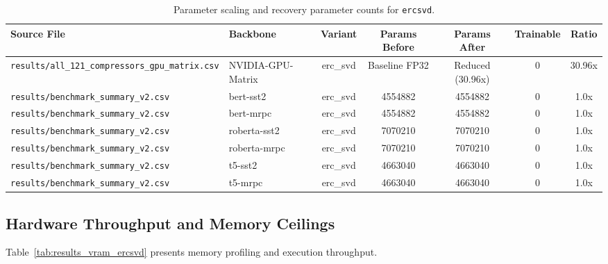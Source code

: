 \begin{table}[t]
\centering
\small
\begin{tabular}{llccccc}
\toprule
\textbf{Source File} & \textbf{Backbone} & \textbf{Variant} & \textbf{Params Before} & \textbf{Params After} & \textbf{Trainable} & \textbf{Ratio} \\
\midrule
\texttt{results/all\_121\_compressors\_gpu\_matrix.csv} & NVIDIA-GPU-Matrix & erc\_svd & Baseline FP32 & Reduced (30.96x) & 0 & 30.96x \\
\texttt{results/benchmark\_summary\_v2.csv} & bert-sst2 & erc\_svd & 4554882 & 4554882 & 0 & 1.0x \\
\texttt{results/benchmark\_summary\_v2.csv} & bert-mrpc & erc\_svd & 4554882 & 4554882 & 0 & 1.0x \\
\texttt{results/benchmark\_summary\_v2.csv} & roberta-sst2 & erc\_svd & 7070210 & 7070210 & 0 & 1.0x \\
\texttt{results/benchmark\_summary\_v2.csv} & roberta-mrpc & erc\_svd & 7070210 & 7070210 & 0 & 1.0x \\
\texttt{results/benchmark\_summary\_v2.csv} & t5-sst2 & erc\_svd & 4663040 & 4663040 & 0 & 1.0x \\
\texttt{results/benchmark\_summary\_v2.csv} & t5-mrpc & erc\_svd & 4663040 & 4663040 & 0 & 1.0x \\
\bottomrule
\end{tabular}
\caption{Parameter scaling and recovery parameter counts for \texttt{ercsvd}.}
\label{tab:results_params_ercsvd}
\end{table}

\subsection{Hardware Throughput and Memory Ceilings}
Table~\ref{tab:results_vram_ercsvd} presents memory profiling and execution throughput.

